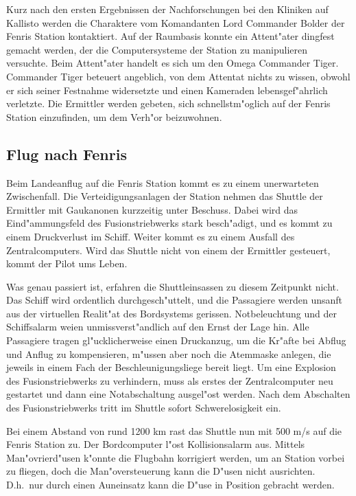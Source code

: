 Kurz nach den ersten Ergebnissen der Nachforschungen bei den Kliniken auf Kallisto werden die Charaktere vom Komandanten Lord Commander Bolder der Fenris Station kontaktiert. Auf der Raumbasis konnte ein Attent"ater dingfest gemacht werden, der die Computersysteme der Station zu manipulieren versuchte. Beim Attent"ater handelt es sich um den Omega Commander Tiger. Commander Tiger beteuert angeblich, von dem Attentat nichts zu wissen, obwohl er sich seiner Festnahme widersetzte und einen Kameraden lebensgef"ahrlich verletzte. Die Ermittler werden gebeten, sich schnellstm"oglich auf der Fenris Station einzufinden, um dem Verh"or beizuwohnen.

\subsection{Flug nach Fenris}

Beim Landeanflug auf die Fenris Station kommt es zu einem unerwarteten Zwischenfall. Die Verteidigungsanlagen der Station nehmen das Shuttle der Ermittler mit Gau\3kanonen kurzzeitig unter Beschuss. Dabei wird das Eind"ammungsfeld des Fusionstriebwerks stark besch"adigt, und es kommt zu einem Druckverlust im Schiff. Weiter kommt es zu einem Ausfall des Zentralcomputers. Wird das Shuttle nicht von einem der Ermittler gesteuert, kommt der Pilot ums Leben.

Was genau passiert ist, erfahren die Shuttleinsassen zu diesem Zeitpunkt nicht. Das Schiff wird ordentlich durchgesch"uttelt, und die Passagiere werden unsanft aus der virtuellen Realit"at des Bordsystems gerissen. Notbeleuchtung und der Schiffsalarm wei\3en unmissverst"andlich auf den Ernst der Lage hin. Alle Passagiere tragen gl"ucklicherweise einen Druckanzug, um die Kr"afte bei Abflug und Anflug zu kompensieren, m"ussen aber noch die Atemmaske anlegen, die jeweils in einem Fach der Beschleunigungsliege bereit liegt. Um eine Explosion des Fusionstriebwerks zu verhindern, muss als erstes der Zentralcomputer neu gestartet und dann eine Notabschaltung ausgel"ost werden. Nach dem Abschalten des Fusionstriebwerks tritt im Shuttle sofort Schwerelosigkeit ein.

Bei einem Abstand von rund 1200 km rast das Shuttle nun mit 500 m/s auf die Fenris Station zu. Der Bordcomputer l"ost Kollisionsalarm aus. Mittels Man"ovrierd"usen k"onnte die Flugbahn korrigiert werden, um an Station vorbei zu fliegen, doch die Man"oversteuerung kann die D"usen nicht ausrichten. D.h.~nur durch einen Au\3neinsatz kann die D"use in Position gebracht werden.

